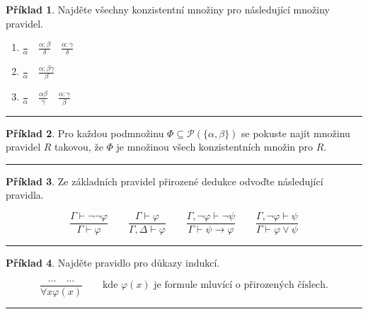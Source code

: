 \documentclass[a4paper]{article}
\theoremstyle{definition}
\newtheorem{priklad}{Příklad}
\begin{document}
\begin{priklad}
    Najděte všechny konzistentní množiny pro následující množiny pravidel.
    
    \begin{enumerate}
      \item $\displaystyle \frac{}{\alpha} \quad \frac{\alpha:\beta}{\delta} \quad \frac{\alpha:\gamma}{\delta}$
      \item $\displaystyle \frac{}{\alpha} \quad \frac{\alpha:\beta\gamma}{\beta}$
      \item $\displaystyle \frac{}{\alpha} \quad \frac{\alpha\beta}{\gamma} \quad \frac{\alpha:\gamma}{\beta}$
    \end{enumerate}
    
\noindent\rule{\linewidth}{.2pt}    
\end{priklad}

\begin{priklad}
    Pro každou podmnožinu $ \Phi\subseteq \mathcal{P}(\{\alpha,\beta\}) $ se pokuste najít množinu pravidel $ R $ takovou, že $ \Phi $ je množinou všech konzistentních množin pro $ R $.
    
\noindent\rule{\linewidth}{.2pt}    
\end{priklad}

\begin{priklad}
    Ze základních pravidel přirozené dedukce odvoďte následující pravidla.
    
    \[
    \frac{\Gamma\vdash \neg\neg\varphi}{\Gamma\vdash\varphi} \qquad 
    \frac{\Gamma\vdash \varphi}{\Gamma,\Delta\vdash\varphi} \qquad
    \frac{\Gamma,\neg\varphi\vdash \neg\psi}{\Gamma\vdash\psi\rightarrow\varphi} \qquad
    \frac{\Gamma,\neg\varphi\vdash \psi}{\Gamma\vdash\varphi\vee\psi}
    \]
    
\noindent\rule{\linewidth}{.2pt}    
\end{priklad}

\begin{priklad}
    Najděte pravidlo pro důkazy indukcí.
    
    \[ \frac{\ldots\quad\ldots}{\forall x\varphi(x)} \qquad \text{kde } \varphi(x) \text{ je formule mluvící o přirozených číslech.} \]
    
\noindent\rule{\linewidth}{.2pt}    
\end{priklad}

\newpage
\end{document}
